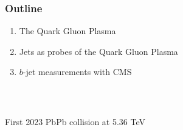 \begin{frame}
  \frametitle{\textbf{Outline}}
  \begin{enumerate}
  \item \label{th1} The Quark Gluon Plasma
  \item \label{th2} Jets as probes of the Quark Gluon Plasma
  \item \label{th3} $b$-jet measurements with CMS
  \end{enumerate}

  \

  \begin{columns}
  \end{columns}
  \centering \scriptsize First 2023 PbPb collision at 5.36 TeV
\end{frame}
